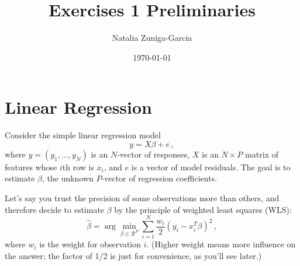 \documentclass[11 pt]{article}
\author{Natalia Zuniga-Garcia}
\title{Exercises 1 Preliminaries}
\date{\today}
\begin{document}
\maketitle

\section{Linear Regression}\label{sec:linr}
Consider the simple linear regression model
$$
y = X \beta + e \, ,
$$
where $y = (y_1, \ldots, y_N)$ is an $N$-vector of responses, $X$ is an $N \times P$ matrix of features whose $i$th row is $x_i$, and $e$ is a vector of model residuals.  The goal is to estimate $\beta$, the unknown $P$-vector of regression coefficients.  

Let's say you trust the precision of some observations more than others, and therefore decide to estimate $\beta$ by the principle of weighted least squares (WLS):
$$
\hat{\beta} = \arg \min_{\beta \in \mathcal{R}^P} \sum_{i=1}^N \frac{w_i}{2}(y_i - x_i^T \beta)^2 \, ,
$$
where $w_i$ is the weight for observation $i$.  (Higher weight means more influence on the answer; the factor of 1/2 is just for convenience, as you'll see later.)
\end{document}
